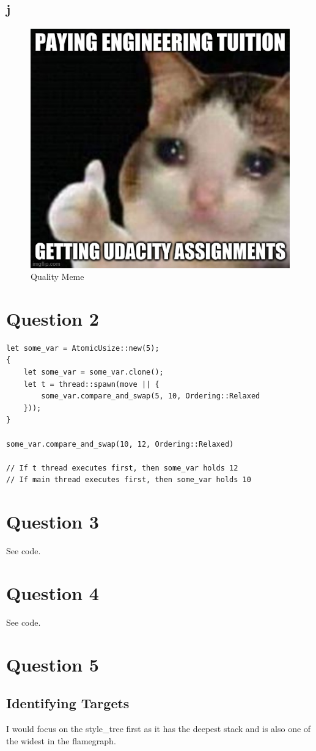 \documentclass[12pt]{article}
\begin{document}
\subsection{j}
\begin{figure}[H]
    \centering
    \includegraphics[width=0.6\linewidth]{meme.jpg}
    \caption{Quality Meme}
    \label{fig:meme}
\end{figure}

\section{Question 2}
\begin{lstlisting}
let some_var = AtomicUsize::new(5);
{
    let some_var = some_var.clone();
    let t = thread::spawn(move || {
        some_var.compare_and_swap(5, 10, Ordering::Relaxed
    }));
}

some_var.compare_and_swap(10, 12, Ordering::Relaxed)

// If t thread executes first, then some_var holds 12
// If main thread executes first, then some_var holds 10
\end{lstlisting}
\section{Question 3}
See code.

\section{Question 4}
See code.

\section{Question 5}
\subsection{Identifying Targets}
I would focus on the style\_tree first as it has the deepest stack and is also one of the widest in the flamegraph.
\end{document}
